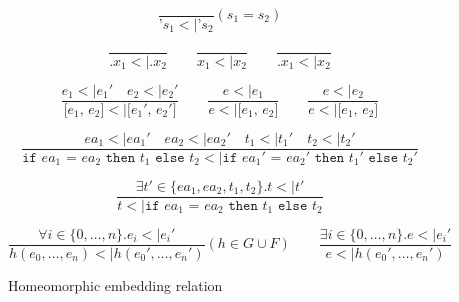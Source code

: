 \documentclass[10pt]{../sigplanconf}
\newcommand{\nfrac}[2]{\frac{\displaystyle{#1}}{\displaystyle{#2}}}
\newcommand{\tagsc}[1]{\tag{\scshape #1}}
\begin{document}
\begin{figure}\centering
  \begin{equation}
    \nfrac{
    }{
      \texttt{'}s_1 <| \texttt{'}s_2
    } (s_1 = s_2) \tagsc{Atoms}
  \end{equation}

  \begin{equation}
    \nfrac{
    }{
      \texttt{.}x_1 <| \texttt{.}x_2
    }
    \qquad
    \nfrac{
    }{
      x_1 <| x_2
    }
    \qquad
    \nfrac{
    }{
      \texttt{.}x_1 <| x_2
    } \tagsc{Variables}
  \end{equation}

  \begin{equation}
    \nfrac{
      e_1 <| e_1'\quad e_2 <| e_2'
    }{
      \texttt{[$e_1$, $e_2$]} <| \texttt{[$e_1'$, $e_2'$]}
    }
    \qquad
    \nfrac{
      e <| e_1
    }{
      e <| \texttt{[$e_1$, $e_2$]}
    }
    \qquad
    \nfrac{
      e <| e_2
    }{
      e <| \texttt{[$e_1$, $e_2$]}
    }
    \tagsc{Cons}
  \end{equation}

  \begin{equation}
    \nfrac{
      ea_1 <| ea_1' \quad ea_2 <| ea_2' \quad t_1 <| t_1' \quad t_2 <| t_2'
    }{
      \texttt{if $ea_1$ = $ea_2$ then $t_1$ else $t_2$} <| \texttt{if $ea_1'$ = $ea_2'$ then $t_1'$ else $t_2'$}
    } \tagsc{If-A}
  \end{equation}

  \begin{equation}
    \nfrac{
      \exists t' \in \{ea_1, ea_2, t_1, t_2\}. t <| t'
    }{
      t <| \texttt{if $ea_1$ = $ea_2$ then $t_1$ else $t_2$}
    } \tagsc{If-B}
  \end{equation}

\begin{equation}
  \nfrac{
    \forall i \in \{0, \ldots, n\}. e_i <| e_i'
  }{
    h(e_0, \ldots, e_n) <| h(e_0', \ldots, e_n')
  } (h \in G \cup F)
  \qquad
  \nfrac{
    \exists i \in \{0, \ldots, n\}. e <| e_i'
  }{
    e <| h(e_0', \ldots, e_n')
  }
 \tagsc{Call}
\end{equation}

\caption{Homeomorphic embedding relation}
\label{fig:embedding}
\end{figure}






\end{document}
